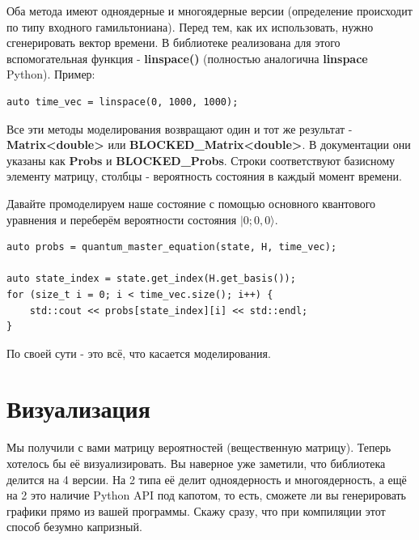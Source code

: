 \documentclass[12pt,fleqn]{article}
\begin{document}
        Оба метода имеют одноядерные и многоядерные версии (определение происходит по типу входного гамильтониана). 
        Перед тем, как их использовать, нужно сгенерировать вектор времени. В библиотеке реализована для этого вспомогательная функция - \textbf{linspace()} 
        (полностью аналогична \textbf{linspace} Python). Пример:

\begin{mdframed}[linecolor=black, topline=true, bottomline=true,
leftline=false, rightline=false]
\begin{verbatim}
auto time_vec = linspace(0, 1000, 1000);
\end{verbatim}
\end{mdframed}

        Все эти методы моделирования возвращают один и тот же результат - \textbf{Matrix<double>} или \textbf{BLOCKED\_Matrix<double>}. 
        В документации они указаны как \textbf{Probs} и \textbf{BLOCKED\_Probs}. Строки соответствуют базисному элементу матрицу, 
        столбцы - вероятность состояния в каждый момент времени.

        Давайте промоделируем наше состояние с помощью основного квантового уравнения и переберём вероятности состояния $|0;0,0\rangle$.

\begin{mdframed}[linecolor=black, topline=true, bottomline=true,
leftline=false, rightline=false]
\begin{verbatim}
auto probs = quantum_master_equation(state, H, time_vec);

auto state_index = state.get_index(H.get_basis());
for (size_t i = 0; i < time_vec.size(); i++) {
    std::cout << probs[state_index][i] << std::endl;
}
\end{verbatim}
\end{mdframed}

        По своей сути - это всё, что касается моделирования.

        \section{Визуализация}

        Мы получили с вами матрицу вероятностей (вещественную матрицу). Теперь хотелось бы её визуализировать. 
        Вы наверное уже заметили, что библиотека делится на 4 версии. На 2 типа её делит одноядерность и многоядерность, 
        а ещё на 2 это наличие Python API под капотом, то есть, сможете ли вы генерировать графики прямо из вашей программы. Скажу сразу, что при компиляции этот способ безумно капризный.
\end{document}
